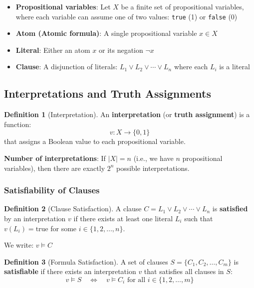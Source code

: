 \documentclass[11pt,a4paper]{article}
\theoremstyle{definition}
\newtheorem{definition}{Definition}[section]
\theoremstyle{plain}
\theoremstyle{remark}
\begin{document}
\begin{itemize}
    \item \textbf{Propositional variables}: Let $X$ be a finite set of propositional variables, where each variable can assume one of two values: \texttt{true} (1) or \texttt{false} (0)
    
    \item \textbf{Atom (Atomic formula)}: A single propositional variable $x \in X$
    
    \item \textbf{Literal}: Either an atom $x$ or its negation $\neg x$
    
    \item \textbf{Clause}: A disjunction of literals: $L_1 \lor L_2 \lor \cdots \lor L_n$ where each $L_i$ is a literal
\end{itemize}

\subsection{Interpretations and Truth Assignments}

\begin{tcolorbox}[colback=green!5!white,colframe=green!75!black,title=\textbf{Interpretation}]
\begin{definition}[Interpretation]
An \textbf{interpretation} (or \textbf{truth assignment}) is a function:
\[
v: X \rightarrow \{0, 1\}
\]
that assigns a Boolean value to each propositional variable.
\end{definition}
\end{tcolorbox}

\textbf{Number of interpretations}: If $|X| = n$ (i.e., we have $n$ propositional variables), then there are exactly $2^n$ possible interpretations.

\subsubsection{Satisfiability of Clauses}

\begin{tcolorbox}[colback=purple!5!white,colframe=purple!75!black,title=\textbf{Satisfaction}]
\begin{definition}[Clause Satisfaction]
A clause $C = L_1 \lor L_2 \lor \cdots \lor L_n$ is \textbf{satisfied} by an interpretation $v$ if there exists at least one literal $L_i$ such that $v(L_i) = \text{true}$ for some $i \in \{1, 2, \dots, n\}$.

We write: $v \models C$
\end{definition}

\begin{definition}[Formula Satisfaction]
A set of clauses $S = \{C_1, C_2, \dots, C_m\}$ is \textbf{satisfiable} if there exists an interpretation $v$ that satisfies all clauses in $S$:
\[
v \models S \quad \Leftrightarrow \quad v \models C_i \text{ for all } i \in \{1, 2, \dots, m\}
\]
\end{definition}
\end{tcolorbox}
\end{document}
